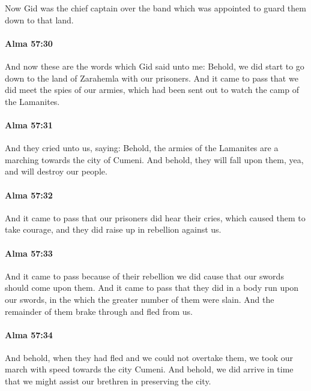 			Now Gid was the chief captain over the band
			which was appointed to guard them down to that land.

		\paragraph{Alma 57:30} %
			\label{ALMA-57-30}

			And now these are the words which Gid said unto me:
			Behold, we did start to go down to the land of Zarahemla with our prisoners.
			And it came to pass that we did meet the spies of our armies,
			which had been sent out to watch the camp of the Lamanites.

		\paragraph{Alma 57:31} %
			\label{ALMA-57-31}

			And they cried unto us, saying:
			Behold, the armies of the Lamanites are a marching towards the city of Cumeni.
			And behold, they will fall upon them, yea, and will destroy our people.

		\paragraph{Alma 57:32} %
			\label{ALMA-57-32}

			And it came to pass that our prisoners did hear their cries,
			which caused them to take courage,
			and they did raise up in rebellion against us.

		\paragraph{Alma 57:33} %
			\label{ALMA-57-33}

			And it came to pass because of their rebellion
			we did cause that our swords should come upon them.
			And it came to pass that they did in a body run upon our swords,
			in the which the greater number of them were slain.
			And the remainder of them brake through and fled from us.

		\paragraph{Alma 57:34} %
			\label{ALMA-57-34}

			And behold, when they had fled and we could not overtake them,
			we took our march with speed towards the city Cumeni.
			And behold, we did arrive in time
			that we might assist our brethren in preserving the city.

